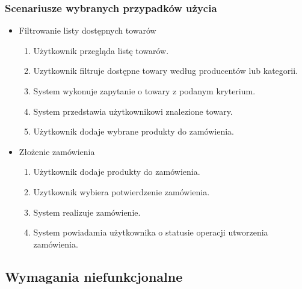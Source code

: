 \documentclass[a4paper, 12pt]{article}
\begin{document}
\subsubsection{Scenariusze wybranych przypadków użycia}
\begin{itemize}
\item Filtrowanie listy dostępnych towarów
\begin{enumerate}
\item Użytkownik przegląda listę towarów.
\item Uzytkownik filtruje dostępne towary według producentów lub kategorii.
\item System wykonuje zapytanie o towary z podanym kryterium.
\item System przedstawia użytkownikowi znalezione towary.
\item Użytkownik dodaje wybrane produkty do zamówienia.
\end{enumerate}

\item Złożenie zamówienia
\begin{enumerate}
\item Użytkownik dodaje produkty do zamówienia.
\item Uzytkownik wybiera potwierdzenie zamówienia.
\item System realizuje zamówienie.
\item System powiadamia użytkownika o statusie operacji utworzenia zamówienia.
\end{enumerate}
\end{itemize}

\subsection{Wymagania niefunkcjonalne}
\end{document}
